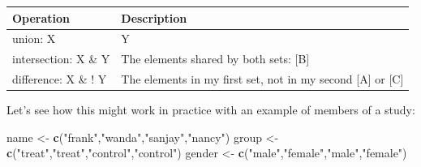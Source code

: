 \documentclass[]{book}
\newenvironment{Shaded}{\begin{snugshade}}{\end{snugshade}}
\newcommand{\KeywordTok}[1]{\textcolor[rgb]{0.13,0.29,0.53}{\textbf{#1}}}
\newcommand{\NormalTok}[1]{#1}
\newcommand{\StringTok}[1]{\textcolor[rgb]{0.31,0.60,0.02}{#1}}
\theoremstyle{definition}
\theoremstyle{definition}
\theoremstyle{definition}
\theoremstyle{remark}
\begin{document}
\begin{longtable}[]{@{}ll@{}}
\toprule
\begin{minipage}[b]{0.53\columnwidth}\raggedright
Operation\strut
\end{minipage} & \begin{minipage}[b]{0.41\columnwidth}\raggedright
Description\strut
\end{minipage}\tabularnewline
\midrule
\endhead
\begin{minipage}[t]{0.53\columnwidth}\raggedright
union: X\strut
\end{minipage} & \begin{minipage}[t]{0.41\columnwidth}\raggedright
Y\strut
\end{minipage}\tabularnewline
\begin{minipage}[t]{0.53\columnwidth}\raggedright
intersection: X \& Y\strut
\end{minipage} & \begin{minipage}[t]{0.41\columnwidth}\raggedright
The elements shared by both sets: {[}B{]}\strut
\end{minipage}\tabularnewline
\begin{minipage}[t]{0.53\columnwidth}\raggedright
difference: X \& ! Y\strut
\end{minipage} & \begin{minipage}[t]{0.41\columnwidth}\raggedright
The elements in my first set, not in my second {[}A{]} or {[}C{]}\strut
\end{minipage}\tabularnewline
\bottomrule
\end{longtable}

Let's see how this might work in practice with an example of members of
a study:

\begin{Shaded}
\begin{Highlighting}[]
\NormalTok{name <-}\StringTok{ }\KeywordTok{c}\NormalTok{(}\StringTok{"frank"}\NormalTok{,}\StringTok{"wanda"}\NormalTok{,}\StringTok{"sanjay"}\NormalTok{,}\StringTok{"nancy"}\NormalTok{)}
\NormalTok{group <-}\StringTok{ }\KeywordTok{c}\NormalTok{(}\StringTok{"treat"}\NormalTok{,}\StringTok{"treat"}\NormalTok{,}\StringTok{"control"}\NormalTok{,}\StringTok{"control"}\NormalTok{)}
\NormalTok{gender <-}\StringTok{ }\KeywordTok{c}\NormalTok{(}\StringTok{"male"}\NormalTok{,}\StringTok{"female"}\NormalTok{,}\StringTok{"male"}\NormalTok{,}\StringTok{"female"}\NormalTok{)}
\end{Highlighting}
\end{Shaded}
\end{document}
